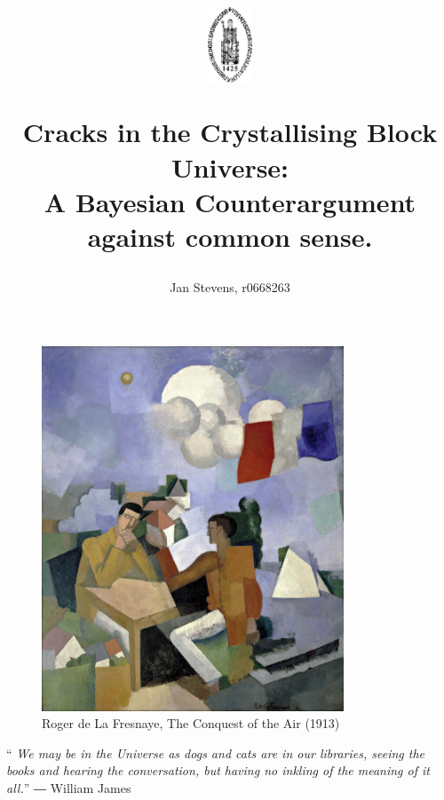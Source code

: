 \documentclass[11pt, a4 paper]{article}
\title{\begin{center}
    \includegraphics[width=0.1\textwidth]{Pictures/image.jpg}
\end{center}\vspace{1cm}
\textbf{Cracks in the Crystallising Block Universe:\\ A Bayesian Counterargument against common sense. }}
\author{Jan Stevens, \quad r0668263}
\begin{document}
\maketitle
\begin{center}

\end{center}

\tableofcontents
\newpage 
\clearpage

\vspace*{0.1\textheight}
\begin{figure}[ht]
    \centering
    \includegraphics[width=9cm]{Pictures/fresnaye_conquest_of_air.jpg}
    \caption{Roger de La Fresnaye, The Conquest of the Air (1913) \cite{picture}}
    \label{fig:robert}
\end{figure}
\vspace*{0.15\textheight}

\noindent\enquote{\itshape 
We may be in the Universe as dogs and cats are in our libraries, seeing the books and hearing the conversation, but having no inkling of the
meaning of it all.}\bigbreak
\hfill ― William James \cite{quote}\newline

\newpage
\restoregeometry
\end{document}
